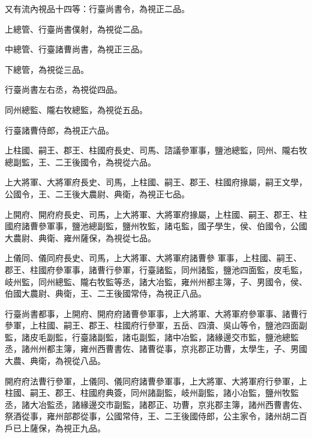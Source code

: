 \begin{pinyinscope}
 又有流內視品十四等：行臺尚書令，為視正二品。



 上總管、行臺尚書僕射，為視從二品。



 中總管、行臺諸曹尚書，為視正三品。



 下總管，為視從三品。



 行臺尚書左右丞，為視從四品。



 同州總監、隴右牧總監，為視從五品。



 行臺諸曹侍郎，為視正六品。



 上柱國、嗣王、郡王、柱國府長史、司馬、諮議參軍事，鹽池總監，同州、隴右牧總副監，王、二王後國令，為視從六品。



 上大將軍、大將軍府長史、司馬，上柱國、嗣王、郡王、柱國府掾屬，嗣王文學，公國令，王、二王後大農尉、典衛，為視正七品。



 上開府、開府府長史、司馬，上大將軍、大將軍府掾屬，上柱國、嗣王、郡王、柱國府諸曹參軍事，鹽池總副監，鹽州牧監，諸屯監，國子學生，侯、伯國令，公國大農尉、典衛、雍州薩保，為視從七品。



 上儀同、儀同府長史、司馬，上大將軍、大將軍府諸曹參
 軍事，上柱國、嗣王、郡王、柱國府參軍事，諸曹行參軍，行臺諸監，同州諸監，鹽池四面監，皮毛監，岐州監，同州總監、隴右牧監等丞，諸大冶監，雍州州都主簿，子、男國令，侯、伯國大農尉、典衛，王、二王後國常侍，為視正八品。



 行臺尚書都事，上開府、開府府諸曹參軍事，上大將軍、大將軍府參軍事、諸曹行參軍，上柱國、嗣王、郡王、柱國府行參軍，五岳、四瀆、吳山等令，鹽池四面副監，諸皮毛副監，行臺諸副監，諸屯副監，諸中冶監，諸緣邊交市監，鹽池總監丞，諸州州都主簿，雍州西曹書佐、諸曹從事，京兆郡正功曹，太學生，子、男國大農、典衛，為視從八品。



 開府府法曹行參軍，上儀同、儀同府諸曹參軍事，上大將軍、大將軍府行參軍，上柱國、嗣王、郡王、柱國府典簽，同州諸副監，岐州副監，諸小冶監，鹽州牧監丞，諸大冶監丞，諸緣邊交市副監，諸郡正、功曹，京兆郡主簿，諸州西曹書佐、祭酒從事，雍州部郡從事，公國常侍，王、二王後國侍郎，公主家令，諸州胡二百戶已上薩保，為視正九品。




\end{pinyinscope}
